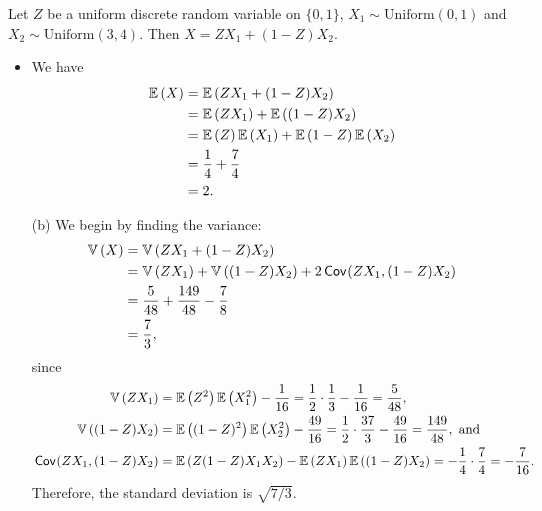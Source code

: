 \begin{ex}
  Let $Z$ be a uniform discrete random variable on $\{0, 1\}$,
  $X_1\sim\text{Uniform}(0, 1)$ and $X_2\sim\text{Uniform}(3, 4)$. Then
  $X=ZX_1 + (1-Z)X_2$.
  \begin{itemize}[(a)]
    \item We have
          \begin{align*}
            \mathbb{E}\left(X\right) & =\mathbb{E}\left(ZX_1 + (1-Z)X_2\right)           \\
                  & =\mathbb{E}\left(ZX_1\right) + \mathbb{E}\left((1-Z)X_2\right)       \\
                  & =\mathbb{E}\left(Z\right)\mathbb{E}\left(X_1\right) + \mathbb{E}\left(1-Z\right)\mathbb{E}\left(X_2\right) \\
                  & =\frac{1}{4}+\frac{7}{4}       \\
                  & =2.
          \end{align*}
    \item[(b)] We begin by finding the variance:
          \begin{align*}
            \mathbb{V}\left(X\right)
             & =\mathbb{V}\left(ZX_1 + (1-Z)X_2\right)                           \\
             & =\mathbb{V}\left(ZX_1\right)+\mathbb{V}\left((1-Z)X_2\right)+2\,\textsf{Cov}\mkern-2mu\left(ZX_1, (1-Z)X_2 \right) \\
             & =\frac{5}{48}+\frac{149}{48}-\frac{7}{8}         \\
             & =\frac{7}{3},
          \end{align*}
          since
          \begin{align*}
            \mathbb{V}\left(ZX_1\right)
             & =\mathbb{E}\left(Z^2\right)\mathbb{E}\left(X_1^2\right)-\frac{1}{16}
            =\frac{1}{2}\cdot\frac{1}{3}-\frac{1}{16}
            =\frac{5}{48},                            \\
            \mathbb{V}\left((1-Z)X_2\right)
             & =\mathbb{E}\left((1-Z)^2\right)\mathbb{E}\left(X_2^2\right)-\frac{49}{16}
            =\frac{1}{2}\cdot\frac{37}{3}-\frac{49}{16}
            =\frac{149}{48},\text{ and}               \\
            \,\textsf{Cov}\mkern-2mu\left(ZX_1, (1-Z)X_2 \right)
             & =\mathbb{E}\left(Z(1-Z)X_1X_2\right)-\mathbb{E}\left(ZX_1\right)\mathbb{E}\left((1-Z)X_2\right)
            =-\frac{1}{4}\cdot\frac{7}{4}
            =-\frac{7}{16}.
          \end{align*}
          Therefore, the standard deviation is $\sqrt{7/3}$.
  \end{itemize}
\end{ex}

